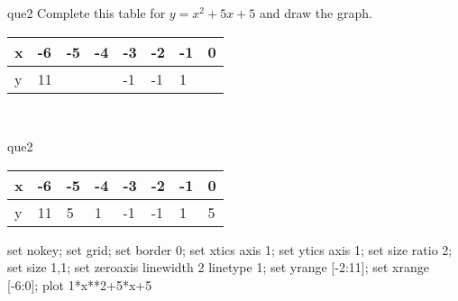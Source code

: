 \documentclass[13.5pt, varwidth=true]{beamer}
\begin{document}
\begin{frame}[shrink=19,fragile]
	\begin{beamercolorbox}[rounded=true, left, shadow=true,wd=14.8cm]{que2}
		 Complete this table for $y = x^{2} + 5x + 5$ and draw the graph. \\[0.3cm] \renewcommand{\arraystretch}{1.2}\begin{tabular}{|C|C|C|C|C|C|C|C|} \hline x & -6 & -5 & -4 & -3 & -2 & -1 & 0 \\ \hline y & 11 &  &  & -1 & -1 & 1 & \\ \hline \end{tabular}\\[0.3cm]
	\end{beamercolorbox}
\end{frame}
\begin{frame}[shrink=19,fragile]
	\begin{beamercolorbox}[rounded=true, left, shadow=true,wd=14.8cm]{que2}
		\renewcommand{\arraystretch}{1.2}\begin{tabular}{|C|C|C|C|C|C|C|C|} \hline x & -6 & -5 & -4 & -3 & -2 & -1 & 0 \\ \hline y & 11 & 5 & 1 & -1 & -1 & 1 & 5\\ \hline \end{tabular}\begin{gnuplot}[terminal=pdf] set nokey; set grid; set border 0; set xtics axis 1; set ytics axis 1; set size ratio 2; set size 1,1; set zeroaxis linewidth 2 linetype 1; set yrange [-2:11]; set xrange [-6:0]; plot 1*x**2+5*x+5 \end{gnuplot}
	\end{beamercolorbox}
\end{frame}
\end{document}
